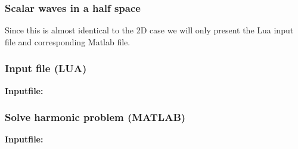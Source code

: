 \clearpage
\subsubsection{Scalar waves in a half space}
Since this is almost identical to the 2D case we
will only present the Lua input file and corresponding 
Matlab file. 

\clearpage
\subsubsection*{Input file (LUA)}
\begin{flushleft}
  \textbf{Inputfile:}
  \\
\end{flushleft}
\hspace{1in}
{\footnotesize
{}
}

\clearpage
\subsubsection*{Solve harmonic problem (MATLAB)}
\begin{flushleft}
  \textbf{Inputfile:}
  \\
\end{flushleft}
\hspace{1in}
{\footnotesize
{}
}

